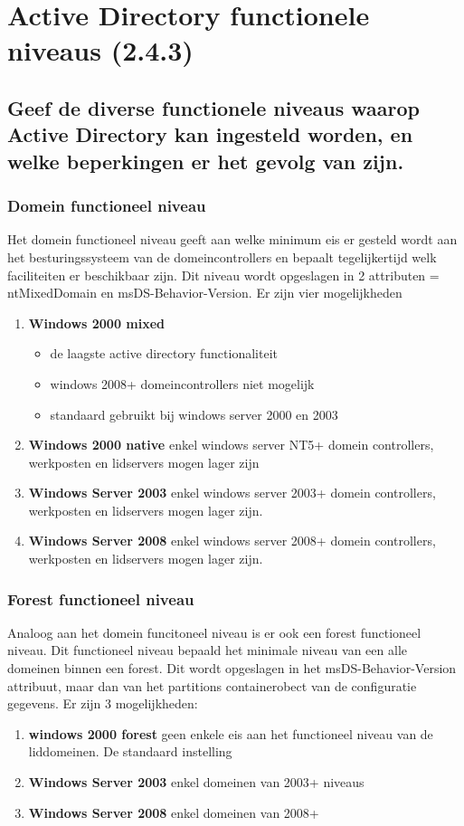\chapter{Active Directory functionele niveaus (2.4.3)}
\section{Geef de diverse functionele niveaus waarop Active Directory kan ingesteld worden, en welke beperkingen er het gevolg van zijn.}

\subsection{Domein functioneel niveau}
Het domein functioneel niveau geeft aan welke minimum eis er gesteld wordt aan het besturingssysteem van de domeincontrollers en bepaalt tegelijkertijd welk faciliteiten er beschikbaar zijn. Dit niveau wordt opgeslagen in 2 attributen = ntMixedDomain en msDS-Behavior-Version. Er zijn vier mogelijkheden
\begin{enumerate}
\item \textbf{Windows 2000 mixed}
\begin{itemize}
\item de laagste active directory functionaliteit
\item windows 2008+ domeincontrollers niet mogelijk
\item standaard gebruikt bij windows server 2000 en 2003
\end{itemize}

\item \textbf{Windows 2000 native} enkel windows server NT5+  domein controllers, werkposten en lidservers mogen lager zijn
\item \textbf{Windows Server 2003} enkel windows server 2003+ domein controllers, werkposten en lidservers mogen lager zijn.
\item \textbf{Windows Server 2008} enkel windows server 2008+ domein controllers, werkposten en lidservers mogen lager zijn.
\end{enumerate}

\subsection{Forest functioneel niveau}
Analoog aan het domein funcitoneel niveau is er ook een forest functioneel niveau. Dit functioneel niveau bepaald het minimale niveau van een alle domeinen binnen een forest. Dit wordt opgeslagen in het msDS-Behavior-Version attribuut, maar dan van het partitions containerobect van de configuratie gegevens. Er zijn 3 mogelijkheden:
\begin{enumerate}
\item \textbf{windows 2000 forest} geen enkele eis aan het functioneel niveau van de liddomeinen. De standaard instelling

\item \textbf{Windows Server 2003} enkel domeinen van 2003+ niveaus 
\item \textbf{Windows Server 2008} enkel domeinen van 2008+ 
\end{enumerate}



